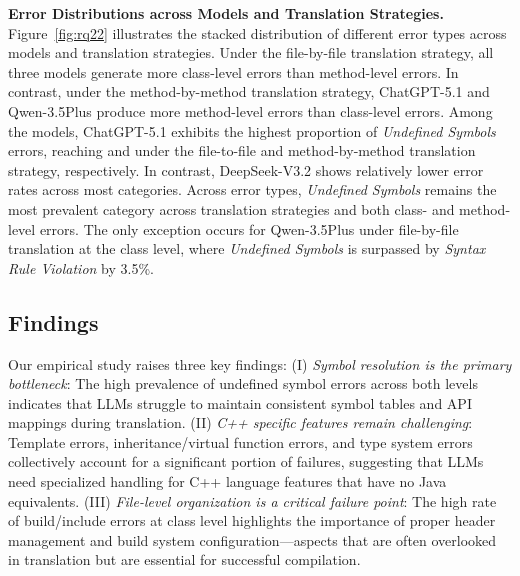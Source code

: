 \textbf{Error Distributions across Models and Translation Strategies.} Figure~\ref{fig:rq22} illustrates the stacked distribution of different error types across models and translation strategies. Under the file-by-file translation strategy, all three models generate more class-level errors than method-level errors. In contrast, under the method-by-method translation strategy, ChatGPT-5.1 and Qwen-3.5Plus produce more method-level errors than class-level errors.  
Among the models, ChatGPT-5.1 exhibits the highest proportion of \textit{Undefined Symbols} errors, reaching  and  under the file-to-file and method-by-method translation strategy, respectively. In contrast, DeepSeek-V3.2 shows relatively lower error rates across most categories. 
Across error types, \textit{Undefined Symbols} remains the most prevalent category across translation strategies and both class- and method-level errors. The only exception occurs for Qwen-3.5Plus under file-by-file translation at the class level, where \textit{Undefined Symbols} is surpassed by \textit{Syntax Rule Violation} by 3.5\%.






\subsection{Findings}


Our empirical study raises three key findings:
(I) \textit{Symbol resolution is the primary bottleneck}: The high prevalence of undefined symbol errors across both levels indicates that LLMs struggle to maintain consistent symbol tables and API mappings during translation.
(II) \textit{C++ specific features remain challenging}: Template errors, inheritance/virtual function errors, and type system errors collectively account for a significant portion of failures, suggesting that LLMs need specialized handling for C++ language features that have no Java equivalents.
(III) \textit{File-level organization is a critical failure point}: The high rate of build/include errors at class level highlights the importance of proper header management and build system configuration---aspects that are often overlooked in translation but are essential for successful compilation.
